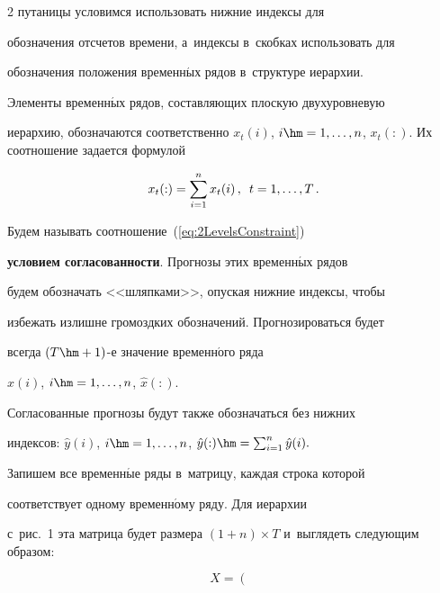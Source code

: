 \begin{multicols}{2}
 путаницы условимся использовать нижние индексы для

обозначения отсчетов времени, а~индексы в~скобках использовать для

обозначения положения временн$\acute{\mbox{ы}}$х рядов в~структуре иерархии.

Элементы временн$\acute{\mbox{ы}}$х рядов, составляющих плоскую двух\-уров\-не\-вую

иерархию, обозначаются соответственно $x_t(i)$, $i \hm= 1, \ldots,

n$, $x_t(:)$. Их соотношение задается формулой

\begin{equation}

\label{eq:2LevelsConstraint}

    x_t(:) = \sum\limits_{i = 1}^n x_t(i)\,, \enskip t = 1, \ldots, T\,.

\end{equation}

Будем называть соотношение~(\ref{eq:2LevelsConstraint})

\textbf{условием согласованности}. Прогнозы этих временн$\acute{\mbox{ы}}$х рядов

будем обозначать <<шляпками>>, опуская нижние индексы, чтобы

избежать излишне громоздких обозначений. Прогнозироваться будет

всегда $(T \hm+ 1)$-е значение временн$\acute{\mbox{о}}$го ряда

$\hat{x}(i)$, $i \hm= 1, \ldots, n$, $\hat{x}(:).$

Согласованные прогнозы будут также обозначаться без нижних

индексов: $\hat{y}(i)$, $i \hm= 1, \ldots, n$, $\hat{y}(:) \hm=

\sum\nolimits_{i = 1}^n \hat{y}(i).$



Запишем все временн$\acute{\mbox{ы}}$е ряды в~матрицу, каждая строка которой

соответствует одному временн$\acute{\mbox{о}}$му ряду. Для иерархии

с~рис.~1 эта матрица будет размера $(1 + n)

\times T$ и~выглядеть следующим образом:

\begin{equation*}


    X = \left(%

\begin{array}{cccc}


\end{array}
\end{equation*}
\end{multicols}
